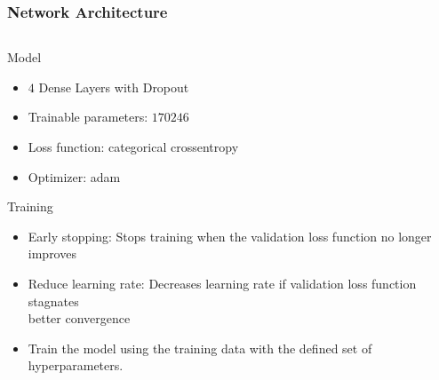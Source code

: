 \documentclass[8pt]{beamer}
\begin{document}
\begin{frame}
\begin{columns}[t]
\begin{column}{0.7\textwidth}
\begin{figure}
            \end{figure}
        \end{column}
    \end{columns}
\end{frame}

\begin{frame}
    \frametitle{Network Architecture}
    \begin{columns}[T]
        \begin{column}{0.7\textwidth}
            \begin{alertblock}{Model}
                \begin{itemize}
                    \item $\num{4}$ Dense Layers with Dropout
                    \item Trainable parameters: $\num{170246}$
                    \item Loss function: categorical crossentropy
                    \item Optimizer: adam
                \end{itemize}
            \end{alertblock}
            \begin{alertblock}{Training}
                \begin{itemize}
                    \item Early stopping: Stops training when the validation loss function no longer improves
                    \item Reduce learning rate: Decreases learning rate if validation loss function stagnates \\
                    \to better convergence
                    \item Train the model using the training data with the defined set of hyperparameters.
                \end{itemize}
            \end{alertblock}
        \end{column}
        \begin{column}{0.3\textwidth}
            \begin{tikzpicture}[
                scale=0.8, every node/.style={scale=0.8},
                layer/.style={rectangle,draw=black,fill=blue!30,minimum size=1cm},
                sum/.style={circle,draw=black,fill=yellow!30},
            ]


\end{tikzpicture}
\end{column}
\end{columns}
\end{frame}
\end{document}
